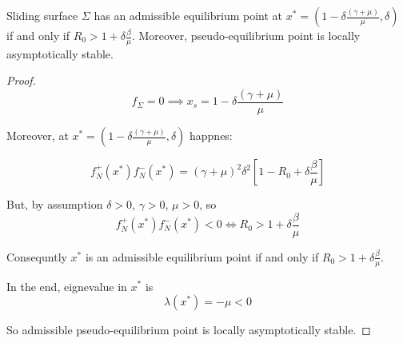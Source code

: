 \begin{lemma}
\label{th:sliding_equilibria}
Sliding surface $\Sigma$ has an admissible equilibrium point at $x^*=(1-\delta\frac{\left(\gamma+\mu\right)}{\mu},\delta)$ if and only if $R_0 > 1+\delta\frac{\beta}{\mu}$. Moreover, pseudo-equilibrium point is locally asymptotically stable.
\end{lemma}

\begin{proof}
\begin{equation}
    f_\Sigma = 0 \implies x_s = 1-\delta\frac{\left(\gamma+\mu\right)}{\mu}
\end{equation}

Moreover, at $x^*=(1-\delta\frac{\left(\gamma+\mu\right)}{\mu},\delta)$ happnes:

\begin{equation}
    f^+_N(x^*)f^-_N(x^*) = (\gamma+\mu)^2\delta^2\left[1-R_0+\delta\frac{\beta}{\mu}\right]
\end{equation}

But, by assumption $\delta > 0$, $\gamma > 0$, $\mu > 0$, so
\begin{equation}
    f^+_N(x^*)f^-_N(x^*) < 0 \iff R_0 > 1+\delta\frac{\beta}{\mu}
\end{equation}

Consequntly $x^*$ is an admissible equilibrium point if and only if $R_0 > 1+\delta\frac{\beta}{\mu}$.

In the end, eignevalue in $x^*$ is
\begin{equation}
    \lambda(x^*) = -\mu < 0
\end{equation}

So admissible pseudo-equilibrium point is locally asymptotically stable.
\end{proof}